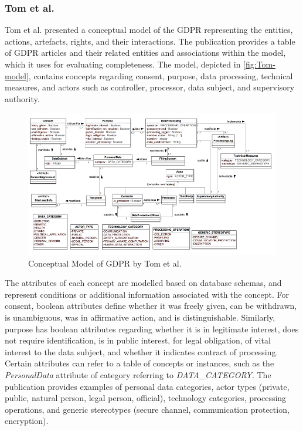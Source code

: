 \subsubsection{Tom et al.}
Tom et al. \cite{tom_conceptual_2018} presented a conceptual model of the GDPR representing the entities, actions, artefacts, rights, and their interactions. The publication provides a table of GDPR articles and their related entities and associations within the model, which it uses for evaluating completeness.
The model, depicted in \autoref{fig:Tom-model}, contains concepts regarding consent, purpose, data processing, technical measures, and actors such as controller, processor, data subject, and supervisory authority.
\begin{figure}[htbp]
    \centering
    \includegraphics[width=\linewidth]{img/Tom_model.png}
    \caption{Conceptual Model of GDPR by Tom et al. \cite{tom_conceptual_2018}}
    \label{fig:Tom-model}
\end{figure}

The attributes of each concept are modelled based on database schemas, and represent conditions or additional information associated with the concept. For consent, boolean attributes define whether it was freely given, can be withdrawn, is unambiguous, was in affirmative action, and is distinguishable. Similarly, purpose has boolean attributes regarding whether it is in legitimate interest, does not require identification, is in public interest, for legal obligation, of vital interest to the data subject, and whether it indicates contract of processing. Certain attributes can refer to a table of concepts or instances, such as the \textit{PersonalData} attribute of category referring to \textit{DATA\_CATEGORY}. The publication provides examples of personal data categories, actor types (private, public, natural person, legal person, official), technology categories, processing operations, and generic stereotypes (secure channel, communication protection, encryption).

